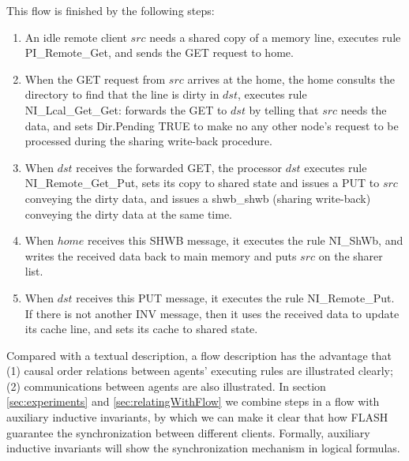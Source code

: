 \documentclass{llncs}
\begin{document}
This flow is finished by the following steps:
\begin{enumerate}
\item An idle remote  client $src$ needs a shared copy of a memory line, executes   rule PI\_Remote\_Get, and  sends the GET request to home.

\item  When the GET request from $src$ arrives at the
home, the home consults the directory to find that the line is dirty in $dst$,  executes rule NI\_Lcal\_Get\_Get: forwards the GET to $dst$ by telling that $src$ needs the data, and sets Dir.Pending TRUE to make no any other node's request to be processed during the sharing write-back procedure.

\item  When $dst$ receives the forwarded GET, the
processor $dst$ executes rule \\
NI\_Remote\_Get\_Put, sets its copy to shared state and issues a PUT to $src$ conveying the dirty data,  and  issues a   shwb\_shwb
 (sharing write-back) conveying the dirty data at the same time.

\item   When $home$ receives this SHWB message, it executes the rule NI\_ShWb, and
 writes the received
data back to main memory and puts $src$ on the sharer list.

\item When $dst$ receives this PUT message, it executes the rule NI\_Remote\_Put. If there is not another INV message, then it   uses the received data to update its cache line, and sets its cache to shared state.


\end{enumerate}

Compared with a textual description, a flow description has the advantage that (1) causal order relations between agents' executing rules are illustrated clearly; (2) communications between agents are also illustrated. In section \ref{sec:experiments} and \ref{sec:relatingWithFlow} we combine steps in a flow with auxiliary inductive invariants, by which we can make it clear that how  FLASH guarantee the synchronization between different clients. Formally, auxiliary inductive invariants will show    the synchronization mechanism in logical formulas.

\end{document}
